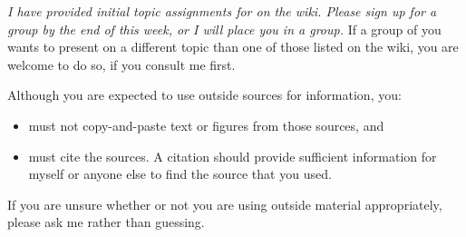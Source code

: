 \documentclass[11pt]{article}
\begin{document}
{\em I have provided initial topic assignments for on the wiki.  Please
sign up for a group by the end of this week, or I will place you in a
group.}  If a group of you wants to present on a different topic than
one of those listed on the wiki, you are welcome to do so, if you
consult me first.

Although you are expected to use outside sources for information, you:
\begin{itemize}
\itemsep=-1pt
\item must not copy-and-paste text or figures from those sources, and
\item must cite the sources. A citation should provide sufficient
  information for myself or anyone else to find the source that you
  used.
\end{itemize}

If you are unsure whether or not you are using outside material
appropriately, please ask me rather than guessing.
\end{document}
